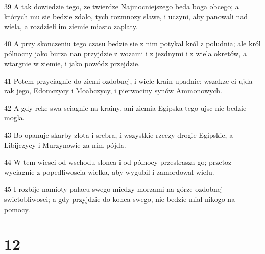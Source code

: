 \par 39 A tak dowiedzie tego, ze twierdze Najmocniejszego beda boga obcego; a których mu sie bedzie zdalo, tych rozmnozy slawe, i uczyni, aby panowali nad wiela, a rozdzieli im ziemie miasto zaplaty.
\par 40 A przy skonczeniu tego czasu bedzie sie z nim potykal król z poludnia; ale król pólnocny jako burza nan przyjdzie z wozami i z jezdnymi i z wiela okretów, a wtargnie w ziemie, i jako powódz przejdzie.
\par 41 Potem przyciagnie do ziemi ozdobnej, i wiele krain upadnie; wszakze ci ujda rak jego, Edomczycy i Moabczycy, i pierwociny synów Ammonowych.
\par 42 A gdy reke swa sciagnie na krainy, ani ziemia Egipska tego ujsc nie bedzie mogla.
\par 43 Bo opanuje skarby zlota i srebra, i wszystkie rzeczy drogie Egipskie, a Libijczycy i Murzynowie za nim pójda.
\par 44 W tem wiesci od wschodu slonca i od pólnocy przestrasza go; przetoz wyciagnie z popedliwoscia wielka, aby wygubil i zamordowal wielu.
\par 45 I rozbije namioty palacu swego miedzy morzami na górze ozdobnej swietobliwosci; a gdy przyjdzie do konca swego, nie bedzie mial nikogo na pomocy.

\chapter{12}

